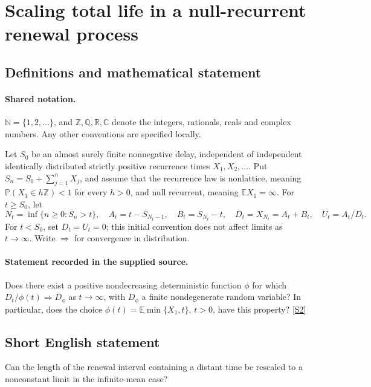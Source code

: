 \documentclass[11pt]{article}
\newcommand{\sref}[2]{\hyperlink{source:#1:#2}{[S#2]}}
\begin{document}
\section{Scaling total life in a null-recurrent renewal process}\label{statement}

\subsection{Definitions and mathematical statement}

\paragraph{Shared notation.}$\mathbb N=\{1,2,\ldots\}$, and $\mathbb Z,\mathbb Q,\mathbb R,\mathbb C$ denote the integers, rationals, reals and complex numbers. Any other conventions are specified locally.


Let $S_0$ be an almost surely finite nonnegative delay, independent of independent identically distributed strictly positive recurrence times $X_1,X_2,\ldots$. Put $S_n=S_0+\sum_{j=1}^nX_j$, and assume that the recurrence law is nonlattice, meaning $\mathbb P(X_1\in h\mathbb Z)<1$ for every $h>0$, and null recurrent, meaning $\mathbb E X_1=\infty$. For $t\ge S_0$, let
\[N_t=\inf\{n\ge0:S_n>t\},\quad A_t=t-S_{N_t-1},\quad B_t=S_{N_t}-t,\quad D_t=X_{N_t}=A_t+B_t,\quad U_t=A_t/D_t.\]
For $t<S_0$, set $D_t=U_t=0$; this initial convention does not affect limits as $t\to\infty$. Write $\Rightarrow$ for convergence in distribution.
\paragraph{Statement recorded in the supplied source.}
Does there exist a positive nondecreasing deterministic function $\phi$ for which $D_t/\phi(t)\Rightarrow D_\phi$ as $t\to\infty$, with $D_\phi$ a finite nondegenerate random variable? In particular, does the choice $\phi(t)=\mathbb E\min\{X_1,t\}$, $t>0$, have this property? \sref{statement}{2}
\subsection{Short English statement}
Can the length of the renewal interval containing a distant time be rescaled to a nonconstant limit in the infinite-mean case?
\end{document}
